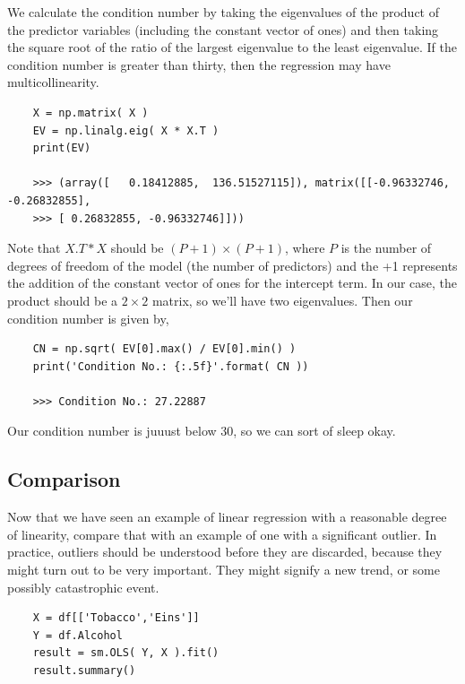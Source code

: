 We calculate the condition number by taking the eigenvalues of the product of the predictor variables (including the constant vector of ones) and then taking the square root of the ratio of the largest eigenvalue to the least eigenvalue. If the condition number is greater than thirty, then the regression may have multicollinearity.

\begin{lstlisting}	
    X = np.matrix( X )
    EV = np.linalg.eig( X * X.T )
    print(EV)

    >>> (array([   0.18412885,  136.51527115]), matrix([[-0.96332746, -0.26832855],
    >>> [ 0.26832855, -0.96332746]]))

\end{lstlisting}

Note that $X.T * X$ should be $( P + 1 ) \times ( P + 1 )$, where $P$ is the number of degrees of freedom of the model (the number of predictors) and the +1 represents the addition of the constant vector of ones for the intercept term. In our case, the product should be a $2 \times 2$ matrix, so we’ll have two eigenvalues. Then our condition number is given by,


\begin{lstlisting}	
    CN = np.sqrt( EV[0].max() / EV[0].min() )
    print('Condition No.: {:.5f}'.format( CN ))

    >>> Condition No.: 27.22887
\end{lstlisting}

Our condition number is juuust below 30, so we can sort of sleep okay.

\subsection{Comparison}

Now that we have seen an example of linear regression with a reasonable degree of linearity, compare that with an example of one with a significant outlier. In practice, outliers should be understood before they are discarded, because they might turn out to be very important. They might signify a new trend, or some possibly catastrophic event.

\begin{lstlisting}
    X = df[['Tobacco','Eins']]
    Y = df.Alcohol
    result = sm.OLS( Y, X ).fit()
    result.summary()
\end{lstlisting}

